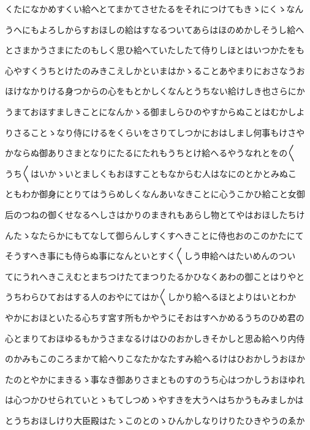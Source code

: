\documentclass[a4paper,11pt,landscape]{ltjtarticle}
\begin{document}
\par\medskip
くたになかめすくい給へとてまかてさせたるをそれにつけてもきゝにくゝなん
\par\medskip
うへにもよろしからすおほしの給はすなるついてあらはほのめかしそうし給へ
\par\medskip
とさまかうさまにたのもしく思ひ給へていたしたて侍りしほとはいつかたをも
\par\medskip
心やすくうちとけたのみきこえしかといまはかゝることあやまりにおさなうお
\par\medskip
ほけなかりける身つからの心をもとかしくなんとうちない給けしき也さらにか
\par\medskip
うまておほすましきことになんかゝる御ましらひのやすからぬことはむかしよ
\par\medskip
りさることゝなり侍にけるをくらいをさりてしつかにおはしまし何事もけさや
\par\medskip
かならぬ御ありさまとなりにたるにたれもうちとけ給へるやうなれとをの〱
\par\medskip
うち〱はいかゝいとましくもおほすこともなからむ人はなにのとかとみぬこ
\par\medskip
ともわか御身にとりてはうらめしくなんあいなきことに心うこかひ給こと女御
\par\medskip
后のつねの御くせなるへしさはかりのまきれもあらし物とてやはおほしたちけ
\par\medskip
んたゝなたらかにもてなして御らんしすくすへきことに侍也おのこのかたにて
\par\medskip
そうすへき事にも侍らぬ事になんといとすく〱しう申給へはたいめんのつい
\par\medskip
てにうれへきこえむとまちつけたてまつりたるかひなくあわの御ことはりやと
\par\medskip
うちわらひておはする人のおやにてはか〱しかり給へるほとよりはいとわか
\par\medskip
やかにおほといたる心ちす宮す所もかやうにそおはすへかめるうちのひめ君の
\par\medskip
心とまりておほゆるもかうさまなるけはひのおかしきそかしと思ゐ給へり内侍
\par\medskip
のかみもこのころまかて給へりこなたかなたすみ給へるけはひおかしうおほか
\par\medskip
たのとやかにまきるゝ事なき御ありさまとものすのうち心はつかしうおほゆれ
\par\medskip
は心つかひせられていとゝもてしつめゝやすきを大うへはちかうもみましかは
\par\medskip
とうちおほしけり大臣殿はたゝこのとのゝひんかしなりけりたひきやうのゑか
\par\medskip
\end{document}
